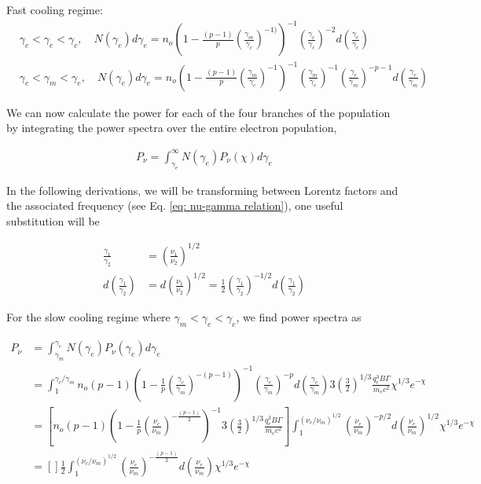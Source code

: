 \documentclass[linenumbers,twocolumn]{aastex631}
\begin{document}
\begin{appendix}
Fast cooling regime:
\begin{align}
	&\gamma_c < \gamma_e < \gamma_c,\quad N(\gamma_e)d\gamma_e = n_o \left(1 - \frac{(p-1)}{p} \left(\frac{\gamma_m}{\gamma_c}\right)^{-1)}\right)^{-1} \left(\frac{\gamma_e}{\gamma_c}\right)^{-2} d\left(\frac{\gamma_e}{\gamma_c}\right)\\
	&\gamma_c < \gamma_m < \gamma_e,\quad N(\gamma_e)d\gamma_e = n_o \left(1 - \frac{(p-1)}{p} \left(\frac{\gamma_m}{\gamma_c}\right)^{-1}\right)^{-1} \left(\frac{\gamma_m}{\gamma_c}\right)^{-1}\left(\frac{\gamma_e}{\gamma_m}\right)^{-p-1} d\left(\frac{\gamma_e}{\gamma_m}\right)
\end{align}

We can now calculate the power for each of the four branches of the population by integrating the power spectra over the entire electron population, 

\begin{align}
	P_\nu = \int_{\gamma_e}^{\infty} N(\gamma_e) P_\nu(\chi) d\gamma_e
\end{align}

In the following derivations, we will be transforming between Lorentz factors and the associated frequency (see Eq. \ref{eq: nu-gamma relation}), one useful substitution will be

\begin{align}
	\frac{\gamma_1}{\gamma_2} &= \left(\frac{\nu_1}{\nu_2}\right)^{1/2} \\
	d\left(\frac{\gamma_1}{\gamma_2}\right) &= d\left(\frac{\nu_1}{\nu_2}\right)^{1/2} = \frac{1}{2} \left(\frac{\gamma_1}{\gamma_2}\right)^{-1/2} d\left(\frac{\gamma_1}{\gamma_2}\right)
\end{align}

For the slow cooling regime where $\gamma_m < \gamma_e < \gamma_c$, we find power spectra as

\begin{align}
	P_\nu &= \int_{\gamma_m}^{\gamma_c} N(\gamma_e) P_{\nu}(\gamma_e) d\gamma_e\\
	&= \int_{1}^{\gamma_c/\gamma_m} n_o (p-1) \left(1 - \frac{1}{p} \left(\frac{\gamma_c}{\gamma_m}\right)^{-(p-1)}\right)^{-1} \left(\frac{\gamma_e}{\gamma_m}\right)^{-p} d\left(\frac{\gamma_e}{\gamma_m}\right) 3 \left( \frac{3}{2}\right)^{1/3} \frac{q_e^3 B \Gamma}{m_e c^2} \chi^{1/3} e^{-\chi}\\
	&= \left[n_o (p-1) \left(1 - \frac{1}{p} \left(\frac{\nu_c}{\nu_m}\right)^{-\frac{(p-1)}{2}}\right)^{-1}  3 \left( \frac{3}{2}\right)^{1/3} \frac{q_e^3 B \Gamma}{m_e c^2} \right]\int_{1}^{(\nu_c/\nu_m)^{1/2}} \left(\frac{\nu_e}{\nu_m}\right)^{-p/2} d\left(\frac{\nu_e}{\nu_m}\right)^{1/2} \chi^{1/3} e^{-\chi}\\
	&= \left[\right]\frac{1}{2} \int_{1}^{(\nu_c/\nu_m)^{1/2}} \left(\frac{\nu_e}{\nu_m}\right)^{-\frac{(p-1)}{2}} d\left(\frac{\nu_e}{\nu_m}\right) \chi^{1/3} e^{-\chi}
\end{align}


\end{appendix}
\end{document}
